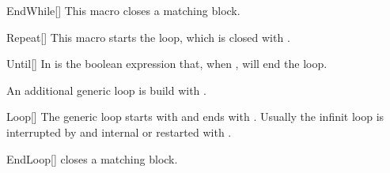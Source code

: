 \documentclass[a4paper, 11pt]{article}
\begin{document}
\begin{macro}{EndWhile}[]
    This macro closes a matching  block.

    \StatementOptions
\end{macro}

\begin{tcblisting}{}
    \begin{algorithmic}
        \EndWhile
    \end{algorithmic}
\end{tcblisting}

\begin{macro}{Repeat}[]
    This macro starts the  loop, which is closed with .

    \BlockOptions
\end{macro}

\begin{macro}{Until}[]
    In  is the boolean expression that, when \True, will end the loop.

    \StatementOptions
\end{macro}


\begin{tcblisting}{}
    \begin{algorithmic}
        \Repeat
    \end{algorithmic}
\end{tcblisting}


An additional generic loop is build with .

\begin{macro}{Loop}[]
    The generic loop starts with  and ends with . Usually the infinit loop is interrupted by and internal  or restarted with .

    \BlockOptions
\end{macro}

\begin{macro}{EndLoop}[]
     closes a matching  block.

    \StatementOptions
\end{macro}
\end{document}
